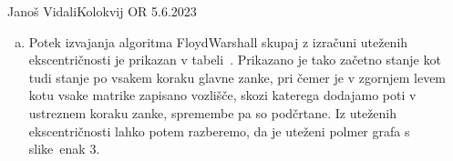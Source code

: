 \begin{naloga}{Janoš Vidali}{Kolokvij OR 5.6.2023}
\begin{odgovor}
\begin{enumerate}[(a)]
Algoritem {\sc FloydWarshall} teče v času $O(n^3)$,
kjer je $n$ število vozlišč v grafu $G$.
Za izračun uteženih ekscentričnosti potem potrebujemo še $O(n^2)$ korakov,
za izračun uteženega polmera pa še $O(n)$ korakov.
Skupna časovna zahtevnost algoritma je torej $O(n^3)$.

V primeru, da ima vhodni graf negativen cikel,
bo to zaznal že algoritem {\sc FloydWarshall},
tako da se lahko v tem primeru tudi naš algoritem ustavi.

\item Potek izvajanja algoritma {\sc FloydWarshall}
skupaj z izračuni uteženih ekscentričnosti je prikazan v tabeli~\tab.
Prikazano je tako začetno stanje kot tudi stanje po vsakem koraku glavne zanke,
pri čemer je v zgornjem levem kotu vsake matrike zapisano vozlišče,
skozi katerega dodajamo poti v ustreznem koraku zanke,
spremembe pa so podčrtane.
Iz uteženih ekscentričnosti lahko potem razberemo,
da je uteženi polmer grafa s slike~\fig enak $3$.
\end{enumerate}


\end{odgovor}
\end{naloga}
